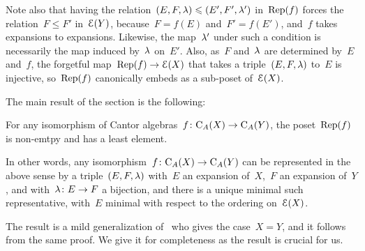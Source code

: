 Note also that having the relation~$(E,F,\lambda)\leqslant (E',F',\lambda')$ in~$\operatorname{Rep}(f)$ forces the relation~$F\le F'$  in~$\mathcal{E}(Y)$, because~\hbox{$F=f(E)$} and~\hbox{$F'=f(E')$}, and~$f$ takes expansions to expansions. Likewise, the map~$\lambda'$ under such a condition is necessarily the map induced by~$\lambda$ on~$E'$. 
Also, as~$F$ and~$\lambda$ are determined by~$E$ and~$f$, the forgetful map~$\operatorname{Rep}(f)\to \mathcal{E}(X)$ that takes a triple~$(E,F,\lambda)$ to~$E$ is injective, so~$\operatorname{Rep}(f)$ canonically embeds as a sub-poset of~$\mathcal{E}(X)$. 




The main result of the section is the following: 

\begin{prop}\label{triples}
For any isomorphism of Cantor algebras~$f\colon\mathrm{C}_A(X)\to \mathrm{C}_A(Y)$, the poset~$\operatorname{Rep}(f)$ is non-emtpy and has a least element. 
\end{prop}



In other words, any isomorphism~$f\colon\mathrm{C}_A(X)\to \mathrm{C}_A(Y)$ can be represented in the above sense by a triple~$(E,F,\lambda)$ with~$E$ an expansion of~$X$,~$F$ an expansion of~$Y$, and with~$\lambda\colon E\to F$ a bijection, and  there is a unique minimal such representative, with~$E$ minimal with respect to the ordering on~$\mathcal{E}(X)$. 


The result is a mild generalization of~\cite[Lem.~4.1]{Higman} who gives the case~$X=Y$, and it follows from the same proof. We give it for completeness as the result is crucial for us. 

